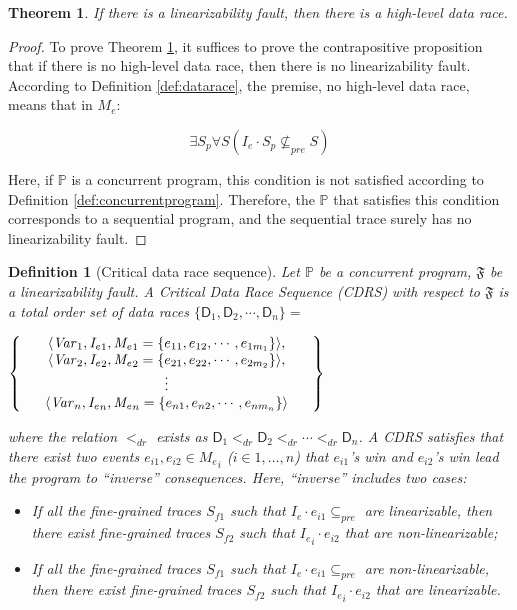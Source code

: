 \documentclass[runningheads]{llncs}
\newcommand{\sset}[1]{\left\{{#1}\right\}}
\newcommand{\se}{\mathit{I_e}}
\newcommand{\ce}{\mathit{M_e}}
\newcommand{\dr}{\mathsf{D}}
\newtheorem{myTheo}{Theorem}
\newtheorem{myDef}{Definition}
\begin{document}
\begin{myTheo}\label{theo:datarace}
   If there is a linearizability fault, then there is a high-level data race.
\end{myTheo}

\begin{proof}
To prove Theorem \ref{theo:datarace}, it suffices to prove the contrapositive proposition that if there is no high-level data race, 
then there is no linearizability fault. According to Definition \ref{def:datarace}, the premise, no high-level data race, means that in $\ce$:

$$\exists S_p \forall S ( \se\cdot S_p \nsubseteq_{pre} S)$$

Here, if $\mathbb{P}$ is a concurrent program, this condition is not satisfied according to Definition \ref{def:concurrentprogram}. 
Therefore, the $\mathbb{P}$ that satisfies this condition corresponds to a sequential program, and the sequential trace surely has no linearizability fault.
\end{proof}


\begin{myDef}[Critical data race sequence]\label{def:cdrs}
    Let  $\mathbb{P}$ be a concurrent program, $\mathfrak{F}$ be a linearizability fault. A \textit{Critical Data Race Sequence} (\textit{CDRS}) with respect to
 $\mathfrak{F}$ is a total order set of data races $\{\mathsf{D}_1,\mathsf{D}_2,\cdots,\mathsf{D}_n\} = $


$\Set{\begin{array}{ccc}
   & \langle\mathit{Var}_1, \se_1, \ce_1 = \sset{e_{11},e_{12},\cdots,e_{1m_1}}\rangle, & \\
   & \langle\mathit{Var}_2, \se_2, \ce_2 = \sset{e_{21},e_{22},\cdots,e_{2m_2}}\rangle, &\\
   & \vdots& \\
   &\langle \mathit{Var}_n, \se_n, \ce_n = \sset{e_{n1},e_{n2},\cdots,e_{nm_n}} \rangle&
   \end{array}}$


\noindent where the relation $<_{dr}$ exists as $\mathsf{D}_1 <_{dr} \dr_2 <_{dr} \cdots  <_{dr} \mathsf{D}_n$.
A CDRS satisfies that there exist two events $e_{i1}, e_{i2}\in \ce_i$ ($i\in{1,\dots,n}$)   that $e_{i1}$'s win and
$e_{i2}$'s win lead the program to ``inverse'' consequences. Here, ``inverse'' includes two cases:
\begin{itemize}
\item If all the fine-grained traces $S_{f1}$ such that $\se\cdot e_{i1} \subseteq_{pre}$ are linearizable, then there exist fine-grained traces $S_{f2}$ such that 
$\mathit{\se_i}\cdot e_{i2}$ that are non-linearizable;
\item If all the fine-grained traces $S_{f1}$ such that $\se\cdot e_{i1} \subseteq_{pre}$ are non-linearizable, then there exist fine-grained traces $S_{f2}$ such that 
$\mathit{\se_i}\cdot e_{i2}$ that are linearizable.\\
\end{itemize}
\end{myDef}
\end{document}
